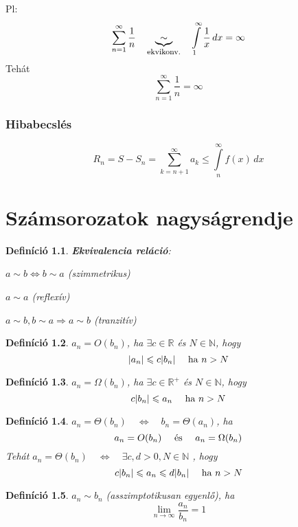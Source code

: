 \documentclass[a4paper,12pt,twoside]{book}
\newtheorem{defi}{Definíció}[chapter]
\theoremstyle{break}
\theoremstyle{plain}
\newcommand{\hatIntegLimits}[4]{\ensuremath{\int\limits^{#2}_{#1} #3\, d#4}}
\begin{document}
Pl:
\[\sum^{\infty}_{n=1} \frac{1}{n} \quad \underbrace{\sim}_{\hbox{\footnotesize ekvikonv.}} \quad \hatIntegLimits{1}{\infty}{\frac{1}{x}}{x} = \infty\]
Tehát 
\[\sum^{\infty}_{n=1} \frac{1}{n} = \infty\]

\subsection{Hibabecslés}

\[R_n = S- S_n = \sum^{\infty}_{k=n+1} a_k \leqslant \hatIntegLimits{n}{\infty}{f(x)}{x}\]

\chapter{Számsorozatok nagyságrendje}

\begin{defi} \textbf{Ekvivalencia reláció}:
 \begin{itemize*}
  \item $a\sim b \Leftrightarrow b\sim a$ (szimmetrikus)
  \item $a\sim a$ (reflexív)
  \item $a\sim b, b\sim a \Rightarrow a\sim b$ (tranzitív)
 \end{itemize*}
\end{defi}

\begin{defi}
 $a_n = O(b_n)$, ha $\exists c\in\mathbb{R}$ és $N\in\mathbb{N}$, hogy
  \[|a_n| \leqslant c|b_n| \quad \hbox{ ha } n> N\]
\end{defi}

\begin{defi}
 $a_n = \Omega(b_n)$, ha $\exists c\in\mathbb{R}^+$ és $N\in\mathbb{N}$, hogy
  \[c|b_n| \leqslant a_n \quad \hbox{ ha } n> N\]
\end{defi}

\begin{defi}
 $a_n = \Theta(b_n) \quad \Leftrightarrow \quad b_n = \Theta(a_n)$, ha 
  \[a_n=O(b_n) \quad\hbox{ és }\quad a_n = \Omega(b_n)\]
 Tehát $a_n = \Theta(b_n) \quad \Leftrightarrow \quad \exists c, d > 0, N\in\mathbb{N}$ , hogy
  \[c|b_n| \leqslant a_n \leqslant d|b_n| \quad \hbox{ ha } n>N\]
\end{defi}

\begin{defi}
 $a_n \sim b_n$ (asszimptotikusan egyenlő), ha
  \[\lim_{n\to\infty} \frac{a_n}{b_n} = 1\]
\end{defi}
\end{document}

